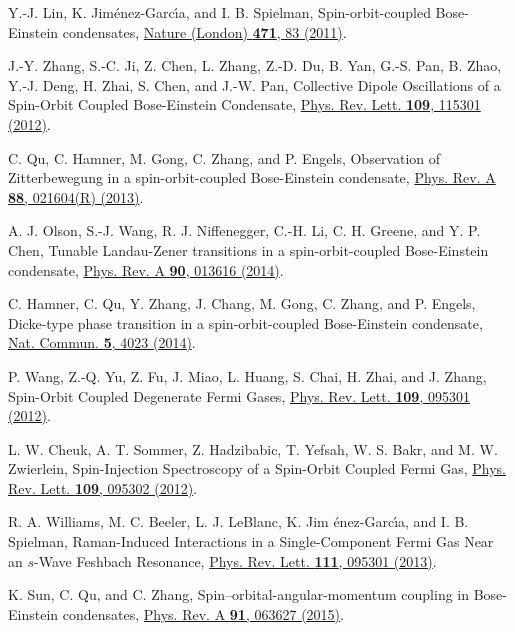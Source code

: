 \documentclass[twocolumn,prl,floatfix,citeautoscript,nofootinbib]{revtex4-1}
\begin{document}
\begin{thebibliography}{99}

 Y.-J. Lin, K. Jim\'{e}nez-Garc\'{\i}a, and I. B. Spielman,
{Spin-orbit-coupled Bose-Einstein condensates}, \href{http://dx.doi.org/10.1038/nature09887}%
{Nature (London) \textbf{471}, 83 (2011)}.

 J.-Y. Zhang, S.-C. Ji, Z. Chen, L. Zhang, Z.-D. Du, B.
Yan, G.-S. Pan, B. Zhao, Y.-J. Deng, H. Zhai, S. Chen, and J.-W. Pan, {%
Collective Dipole Oscillations of a Spin-Orbit Coupled Bose-Einstein
Condensate}, \href{http://dx.doi.org/10.1103/PhysRevLett.109.115301}{Phys.
Rev. Lett. \textbf{109}, 115301 (2012)}.

 C. Qu, C. Hamner, M. Gong, C. Zhang, and P. Engels, {%
Observation of Zitterbewegung in a spin-orbit-coupled Bose-Einstein
condensate}, \href{http://dx.doi.org/10.1103/PhysRevA.88.021604}{Phys. Rev.
A \textbf{88}, 021604(R) (2013)}.

 A. J. Olson, S.-J. Wang, R. J. Niffenegger, C.-H. Li, C.
H. Greene, and Y. P. Chen, {Tunable Landau-Zener transitions in a
spin-orbit-coupled Bose-Einstein condensate}, \href{http://dx.doi.org/10.1103/PhysRevA.90.013616}%
{Phys. Rev. A \textbf{90}, 013616 (2014)}.

 C. Hamner, C. Qu, Y. Zhang, J. Chang, M. Gong, C.
Zhang, and P. Engels, {Dicke-type phase transition in a spin-orbit-coupled
Bose-Einstein condensate}, \href{http://dx.doi.org/10.1038/ncomms5023}{Nat.
Commun. \textbf{5}, 4023 (2014)}.

 P. Wang, Z.-Q. Yu, Z. Fu, J. Miao, L. Huang, S. Chai, H.
Zhai, and J. Zhang, {Spin-Orbit Coupled Degenerate Fermi Gases}, \href{http://dx.doi.org/10.1103/PhysRevLett.109.095301}%
{Phys. Rev. Lett. \textbf{109}, 095301 (2012)}.

 L. W. Cheuk, A. T. Sommer, Z. Hadzibabic, T. Yefsah, W.
S. Bakr, and M. W. Zwierlein, {Spin-Injection Spectroscopy of a Spin-Orbit
Coupled Fermi Gas}, \href{http://dx.doi.org/10.1103/PhysRevLett.109.095302}{%
Phys. Rev. Lett. \textbf{109}, 095302 (2012)}.

 R. A. Williams, M. C. Beeler, L. J. LeBlanc, K. Jim%
\'{e}nez-Garc\'{\i}a, and I. B. Spielman, {Raman-Induced Interactions in a
Single-Component Fermi Gas Near an $s$-Wave Feshbach Resonance}, \href{http://dx.doi.org/10.1103/PhysRevLett.111.095301}%
{Phys. Rev. Lett. \textbf{111}, 095301 (2013)}.

 K. Sun, C. Qu, and C. Zhang, {%
Spin--orbital-angular-momentum coupling in Bose-Einstein condensates}, \href{http://dx.doi.org/10.1103/PhysRevA.91.063627}%
{Phys. Rev. A \textbf{91}, 063627 (2015)}.


\end{thebibliography}
\end{document}
